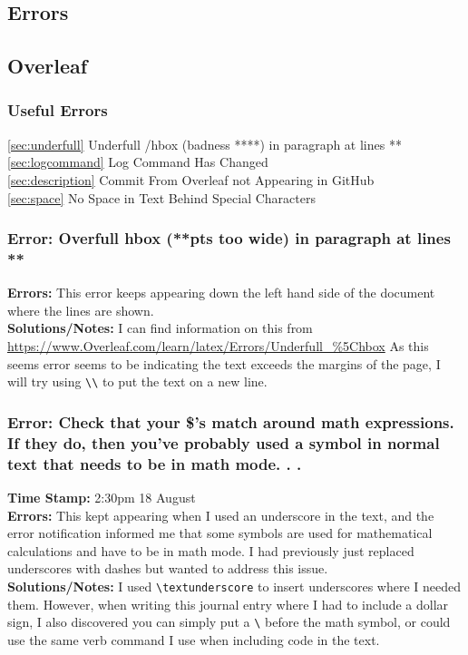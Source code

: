 \documentclass{article}
\begin{document}
\begin{FlushLeft}
\pagebreak


\section{Errors}
\subsection{Overleaf}

\subsubsection{Useful Errors}
\autoref{sec:underfull} Underfull /hbox (badness ****) in paragraph at lines **\\
\autoref{sec:logcommand} Log Command Has Changed\\
\autoref{sec:description} Commit From Overleaf not Appearing in GitHub\\
\autoref{sec:space} No Space in Text Behind Special Characters

\subsubsection{Error: Overfull hbox (**pts too wide) in paragraph at lines **}
\textbf{Errors:} This error keeps appearing down the left hand side of the document where the lines are shown.\\
\textbf{Solutions/Notes:} I can find information on this from \url{https://www.Overleaf.com/learn/latex/Errors/Underfull_%5Chbox}
As this seems error seems to be indicating the text exceeds the margins of the page, I will try using \verb|\\| to put the text on a new line. 

\subsubsection{Error: Check that your \$'s match around math expressions. If they do, then you've probably used a symbol in normal text that needs to be in math mode. . .}
\textbf{Time Stamp:} 2:30pm 18 August\\
\textbf{Errors:} This kept appearing when I used an underscore in the text, and the error notification informed me that some symbols are used for mathematical calculations and have to be in math mode. I had previously just replaced underscores with dashes but wanted to address this issue.\\
\textbf{Solutions/Notes:} I used \verb|\textunderscore| to insert underscores where I needed them. However, when writing this journal entry where I had to include a dollar sign, I also discovered you can simply put a \verb|\| before the math symbol, or could use the same verb command I use when including code in the text.


\end{FlushLeft}
\end{document}
